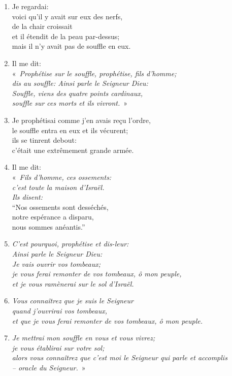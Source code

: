 \begin{enumerate}[leftmargin=\psleftmargin, labelsep = \pslabelsep, label={\arabic*}, font=\color{\pscolor}\small\textsuperscript, parsep=0em, itemsep=0em, topsep=0em ]
    \item Je regardai: \\ voici qu’il y avait sur eux des nerfs, \\ de la chair croissait \\ et il étendit de la peau par-dessus; \\ mais il n’y avait pas de souffle en eux.\verseSpace
    \item Il me dit: \\ \decalage «~\textit{Prophétise sur le souffle, prophétise, fils d’homme; \\ \decalage dis au souffle: Ainsi parle le Seigneur Dieu: \\ \decalage Souffle, viens des quatre points cardinaux, \\ \decalage souffle sur ces morts et ils vivront.}~»
    \item Je prophétisai comme j’en avais reçu l’ordre, \\ le souffle entra en eux et ils vécurent; \\ ils se tinrent debout: \\ c’était une extrêmement grande armée.\newpage
    \item Il me dit: \\ \decalage «~\textit{Fils d’homme, ces ossements: \\ \decalage c’est toute la maison d’Israël. \\ \decalage Ils disent:} \\
    \decalage \decalage “Nos ossements sont desséchés,  \\ \decalage \decalage notre espérance a disparu, \\ \decalage \decalage nous sommes anéantis.”
    \item \decalage \textit{C’est pourquoi, prophétise et dis-leur: \\ \decalage \decalage Ainsi parle le Seigneur Dieu: \\
    \decalage \decalage Je vais ouvrir vos tombeaux; \\ \decalage \decalage je vous ferai remonter de vos tombeaux, ô mon peuple, \\
    \decalage \decalage et je vous ramènerai sur le sol d’Israël.}
    \item \decalage \decalage \textit{Vous connaîtrez que je suis le Seigneur \\ \decalage \decalage quand j’ouvrirai vos tombeaux, \\ \decalage \decalage et que je vous ferai remonter de vos tombeaux, ô mon peuple.}
    \item \decalage \decalage \textit{Je mettrai mon souffle en vous et vous vivrez; \\ \decalage \decalage je vous établirai sur votre sol; \\
    \decalage \decalage alors vous connaîtrez que c’est moi le Seigneur qui parle et accomplis \\ \decalage \decalage – oracle du Seigneur.}~»\parSpace

\end{enumerate}
